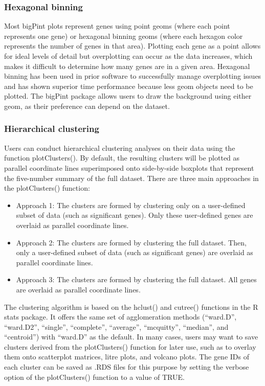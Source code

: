 \documentclass[parskip=full]{bmcart}
\begin{document}
\subsubsection*{Hexagonal binning}

Most bigPint plots represent genes using point geoms (where each point represents one gene) or hexagonal binning geoms (where each hexagon color represents the number of genes in that area). Plotting each gene as a point allows for ideal levels of detail but overplotting can occur as the data increases, which makes it difficult to determine how many genes are in a given area. Hexagonal binning has been used in prior software to successfully manage overplotting issues \cite{carr1987scatterplot, harshbarger2017deiva} and has shown superior time performance because less geom objects need to be plotted. The bigPint package allows users to draw the background using either geom, as their preference can depend on the dataset.

\subsubsection*{Hierarchical clustering}

Users can conduct hierarchical clustering analyses on their data using the function plotClusters(). By default, the resulting clusters will be plotted as parallel coordinate lines superimposed onto side-by-side boxplots that represent the five-number summary of the full dataset. There are three main approaches in the plotClusters() function:

\begin{itemize}  
\item Approach 1: The clusters are formed by clustering only on a user-defined subset of data (such as significant genes). Only these user-defined genes are overlaid as parallel coordinate lines. 
\item Approach 2: The clusters are formed by clustering the full dataset. Then, only a user-defined subset of data (such as significant genes) are overlaid as parallel coordinate lines.
\item Approach 3: The clusters are formed by clustering the full dataset. All genes are overlaid as parallel coordinate lines.
\end{itemize}

The clustering algorithm is based on the hclust() and cutree() functions in the R stats package. It offers the same set of agglomeration methods (``ward.D'', ``ward.D2'', ``single'', ``complete'', ``average'', ``mcquitty'', ``median'', and ``centroid'') with ``ward.D'' as the default. In many cases, users may want to save clusters derived from the plotClusters() function for later use, such as to overlay them onto scatterplot matrices, litre plots, and volcano plots. The gene IDs of each cluster can be saved as .RDS files for this purpose by setting the verbose option of the plotClusters() function to a value of TRUE.
\end{document}
